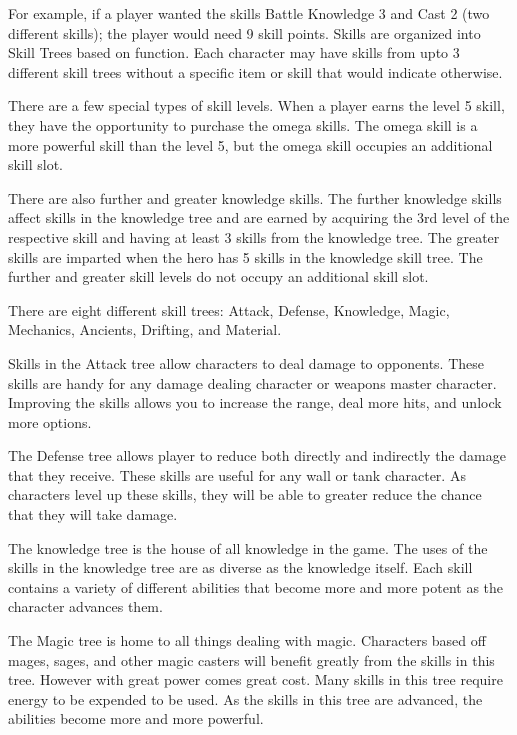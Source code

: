 For example, if a player wanted the skills Battle Knowledge 3 and Cast 2 (two
different skills); the player would need 9 skill points. Skills are organized
into Skill Trees based on function. Each character may have skills from upto 3
different skill trees without a specific item or skill that would indicate
otherwise.

There are a few special types of skill levels. When a player earns the level 5
skill, they have the opportunity to purchase the omega
skills. The omega skill is a more powerful skill than the level 5, but the
omega skill occupies an additional skill slot. 

There are also further and greater knowledge skills. The further knowledge skills affect skills in the
knowledge tree and are earned by acquiring the 3rd level of the respective
skill and having at least 3 skills from the knowledge tree. The greater skills
are imparted when the hero has 5 skills in the knowledge skill tree. The
further and greater skill levels do not occupy an additional skill slot. 


There are eight different skill trees: Attack, Defense, Knowledge, Magic,
Mechanics, Ancients, Drifting, and Material. 

Skills in the Attack tree allow characters to deal damage to
opponents. These skills are handy for any damage dealing character or weapons
master character. Improving the skills allows you to increase the range, deal
more hits, and unlock more options. 

The Defense tree allows player to reduce both directly and
indirectly the damage that they receive. These skills are useful for any wall
or tank character. As characters level up these skills, they will be able to
greater reduce the chance that they will take damage. 

The knowledge tree is the house of all knowledge in the
game. The uses of the skills in the knowledge tree are as diverse as the
knowledge itself. Each skill contains a variety of different abilities that
become more and more potent as the character advances them. 

The Magic tree is home to all things dealing with magic.
Characters based off mages, sages, and other magic casters will benefit greatly
from the skills in this tree. However with great power comes great cost. Many
skills in this tree require energy to be expended to be used. As the skills in
this tree are advanced, the abilities become more and more powerful. 

